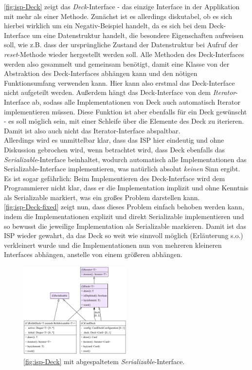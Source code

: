 \autoref{fig:isp-Deck} zeigt das \textit{Deck}-Interface - das einzige Interface in der Applikation mit mehr als einer Methode.
Zunächst ist es allerdings diskutabel, ob es sich hierbei wirklich um ein Negativ-Beispiel handelt, da es sich bei dem Deck-Interface 
um eine Datenstruktur handelt, die besondere Eigenschaften aufweisen soll, wie z.B. dass der ursprüngliche Zustand der Datenstruktur 
bei Aufruf der \textit{reset}-Methode wieder hergestellt werden soll. Alle Methoden des Deck-Interfaces werden also 
gesammelt und gemeinsam benötigt, damit eine Klasse von der Abstraktion des Deck-Interfaces abhängen kann und den nötigen 
Funktionsumfang verwenden kann. Hier kann also erstmal das Deck-Interface nicht aufgeteilt werden. 
Außerdem hängt das Deck-Interface von dem \textit{Iterator}-Interface ab, sodass alle Implementationen von Deck auch 
automatisch Iterator implementieren müssen. Diese Funktion ist aber ebenfalls für ein Deck gewünscht - es soll möglich sein, 
mit einer Schleife über die Elemente des Deck zu iterieren. Damit ist also auch nicht das Iterator-Interface abspaltbar. \\
Allerdings wird es unmittelbar klar, dass das ISP hier eindeutig und ohne Diskussion gebrochen wird, wenn betrachtet wird, 
dass Deck ebenfalls das \textit{Serializable}-Interface beinhaltet, wodurch automatisch alle Implementationen das 
Serializable-Interface implementieren, was natürlich absolut \textit{keinen} Sinn ergibt. Es ist sogar gefährlich: 
Beim Implementieren des Deck-Interface wird dem Programmierer nicht klar, dass er die Implementation implizit und ohne Kenntnis als 
Serializable markiert, was ein großes Problem darstellen kann. \\ 
\autoref{fig:isp-Deck-fixed} zeigt nun, dass dieses Problem einfach behoben werden kann, indem die Implementationen explizit und direkt
Serializable implementieren und so bewusst die jeweilige Implementation als Serializable markieren. Damit ist das ISP wieder gewahrt,
da das Deck so weit wie sinnvoll möglich (Erläuterung s.o.) verkleinert wurde und die Implementationen nun von mehreren kleineren Interfaces abhängen,
anstelle von einem größeren abhängen. 

\begin{figure}[H]
	\centering
	\includegraphics[width=0.5\textwidth]{Bilder/Deck_fixed_structure.pdf} 
	\caption{\autoref{fig:isp-Deck} mit abgespaltetem \textit{Serializable}-Interface.}
	\label{fig:isp-Deck-fixed}
\end{figure} 

